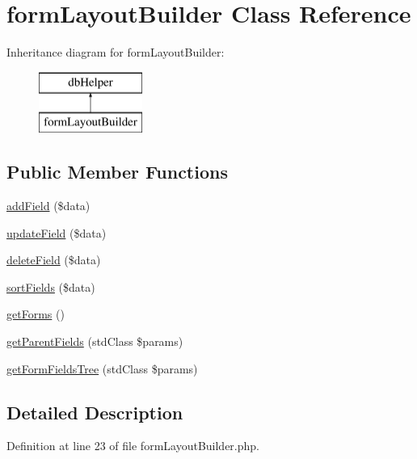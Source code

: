 \hypertarget{classform_layout_builder}{\section{form\-Layout\-Builder \-Class \-Reference}
\label{classform_layout_builder}
}
\-Inheritance diagram for form\-Layout\-Builder\-:\begin{figure}[H]
\begin{center}
\leavevmode
\includegraphics[height=2.000000cm]{classform_layout_builder}
\end{center}
\end{figure}
\subsection*{\-Public \-Member \-Functions}
\begin{DoxyCompactItemize}
\item 
\hyperlink{classform_layout_builder_a09d2fcc356ffec482c2288ed3128f55d}{add\-Field} (\$data)
\item 
\hyperlink{classform_layout_builder_af1ac76169bfb7bbb995f000d5bb9ac2e}{update\-Field} (\$data)
\item 
\hyperlink{classform_layout_builder_a383f52a44383e21583989705ef0d630d}{delete\-Field} (\$data)
\item 
\hyperlink{classform_layout_builder_afcb5238ce6ce86f873765792f9f18ad8}{sort\-Fields} (\$data)
\item 
\hyperlink{classform_layout_builder_a9ff1809bc98bb7a1526eb4e035c1ffa8}{get\-Forms} ()
\item 
\hyperlink{classform_layout_builder_ad7d4c76349c0ed04f32ca58530ffd16b}{get\-Parent\-Fields} (std\-Class \$params)
\item 
\hyperlink{classform_layout_builder_ac89522e4c6cb3d293adce3bd72e91827}{get\-Form\-Fields\-Tree} (std\-Class \$params)
\end{DoxyCompactItemize}


\subsection{\-Detailed \-Description}


\-Definition at line 23 of file form\-Layout\-Builder.\-php.



